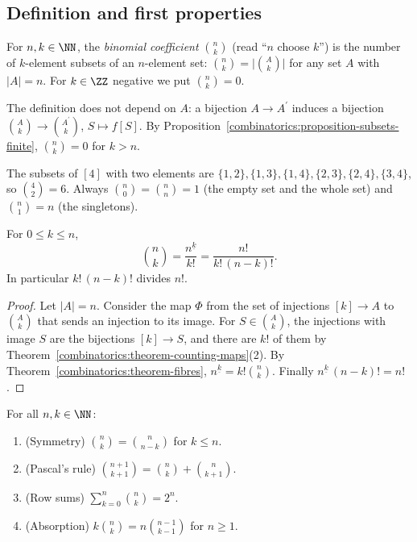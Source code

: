 \subsection{Definition and first properties}\label{combinatorics:subsection-binomial-definition}

\begin{definition}\label{combinatorics:definition-binomial}
For $n, k \in \NN$, the \emph{binomial coefficient} $\binom{n}{k}$ (read ``$n$ choose $k$'') is the number of $k$-element subsets of an $n$-element set: $\binom{n}{k} = \bigl|\binom{A}{k}\bigr|$ for any
set $A$ with $|A| = n$. For $k \in \ZZ$ negative we put $\binom{n}{k} = 0$.
\end{definition}

The definition does not depend on $A$: a bijection $A \to A^{\prime}$ induces a bijection $\binom{A}{k} \to \binom{A^{\prime}}{k}$, $S \mapsto f[S]$. By
Proposition~\ref{combinatorics:proposition-subsets-finite}, $\binom{n}{k} = 0$ for $k > n$.

\begin{example}\label{combinatorics:example-binomial-small}
The subsets of $[4]$ with two elements are $\{1,2\}, \{1,3\}, \{1,4\}, \{2,3\}, \{2,4\}, \{3,4\}$, so $\binom{4}{2} = 6$. Always $\binom{n}{0} = \binom{n}{n} = 1$ (the empty set and the whole set) and
$\binom{n}{1} = n$ (the singletons).
\end{example}

\begin{theorem}\label{combinatorics:theorem-binomial-formula}
For $0 \leq k \leq n$,
\[
\binom{n}{k} = \frac{n^{\underline{k}}}{k!} = \frac{n!}{k!\,(n - k)!}.
\]
In particular $k!\,(n - k)!$ divides $n!$.
\end{theorem}

\begin{proof}
Let $|A| = n$. Consider the map $\Phi$ from the set of injections $[k] \to A$ to $\binom{A}{k}$ that sends an injection to its image. For $S \in \binom{A}{k}$, the injections with image $S$ are the
bijections $[k] \to S$, and there are $k!$ of them by Theorem~\ref{combinatorics:theorem-counting-maps}(2). By Theorem~\ref{combinatorics:theorem-fibres}, $n^{\underline{k}} = k!\binom{n}{k}$. Finally
$n^{\underline{k}}\,(n - k)! = n!$.
\end{proof}

\begin{proposition}\label{combinatorics:proposition-binomial-basic}
For all $n, k \in \NN$:
\begin{enumerate}
\item (Symmetry) $\binom{n}{k} = \binom{n}{n - k}$ for $k \leq n$.
\item (Pascal's rule) $\binom{n + 1}{k + 1} = \binom{n}{k} + \binom{n}{k + 1}$.
\item (Row sums) $\sum_{k=0}^{n}\binom{n}{k} = 2^n$.
\item (Absorption) $k\binom{n}{k} = n\binom{n - 1}{k - 1}$ for $n \geq 1$.
\end{enumerate}
\end{proposition}

